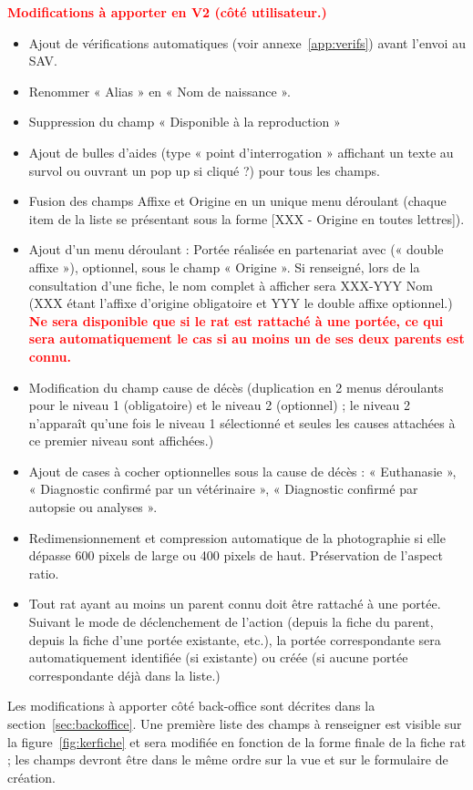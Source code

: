 \documentclass[a4paper,10pt]{article}
\newcommand\desire[1]{\noindent\textbf{\textcolor{red}{#1}}}
\begin{document}
\noindent\desire{Modifications à apporter en V2 (côté utilisateur.)}
\begin{itemize}
\item Ajout de vérifications automatiques (voir annexe~\ref{app:verifs}) avant l'envoi au SAV.
\item Renommer « Alias » en « Nom de naissance ».
\item Suppression du champ « Disponible à la reproduction »
\item Ajout de bulles d'aides (type « point d'interrogation » affichant un texte au survol ou ouvrant un pop up si cliqué ?) pour tous les champs.
\item Fusion des champs Affixe et Origine en un unique menu déroulant (chaque item de la liste se présentant sous la forme [XXX - Origine en toutes lettres]).
\item Ajout d'un menu déroulant : Portée réalisée en partenariat avec (« double affixe »), optionnel, sous le champ « Origine ». Si renseigné, lors de la consultation d'une fiche, le nom complet à afficher sera XXX-YYY Nom (XXX étant l'affixe d'origine obligatoire et YYY le double affixe optionnel.) \desire{Ne sera disponible que si le rat est rattaché à une portée, ce qui sera automatiquement le cas si au moins un de ses deux parents est connu.}
\item Modification du champ cause de décès (duplication en 2 menus déroulants pour le niveau 1 (obligatoire) et le niveau 2 (optionnel) ; le niveau 2 n'apparaît qu'une fois le niveau 1 sélectionné et seules les causes attachées à ce premier niveau sont affichées.)
\item Ajout de cases à cocher optionnelles sous la cause de décès : « Euthanasie », « Diagnostic confirmé par un vétérinaire », « Diagnostic confirmé par autopsie ou analyses ».       
\item Redimensionnement et compression automatique de la photographie si elle dépasse 600 pixels de large ou 400 pixels de haut. Préservation de l'aspect ratio. 
\item Tout rat ayant au moins un parent connu doit être rattaché à une portée. Suivant le mode de déclenchement de l'action (depuis la fiche du parent, depuis la fiche d'une portée existante, etc.), la portée correspondante sera automatiquement identifiée (si existante) ou créée (si aucune portée correspondante déjà dans la liste.)
\end{itemize}

Les modifications à apporter côté back-office sont décrites dans la section~\ref{sec:backoffice}. Une première liste des champs à renseigner est visible sur la figure~\ref{fig:kerfiche} et sera modifiée en fonction de la forme finale de la fiche rat ; les champs devront être dans le même ordre sur la vue et sur le formulaire de création.    
\end{document}

